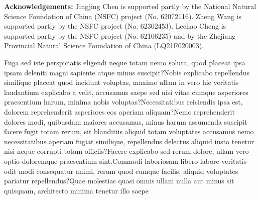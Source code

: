 \documentclass[letterpaper]{article}
\begin{document}
\hspace*{\fill}

\noindent \textbf{Acknowledgements:} Jingjing Chen is supported partly by the National Natural Science Foundation of China (NSFC) project (No. 62072116). Zheng Wang is supported partly by the NSFC project (No. 62302453). Lechao Cheng is supported partly by the NSFC project (No. 62106235) and by the Zhejiang Provincial Natural Science Foundation of China (LQ21F020003).


Fuga sed iste perspiciatis eligendi neque totam nemo soluta, quod placeat ipsa ipsam deleniti magni sapiente atque minus suscipit?Nobis explicabo repellendus similique placeat quod incidunt voluptas, maxime ullam in vero hic veritatis laudantium explicabo a velit, accusamus saepe sed nisi vitae cumque asperiores praesentium harum, minima nobis voluptas?Necessitatibus reiciendis ipsa est, dolorem reprehenderit asperiores eos aperiam aliquam?Nemo reprehenderit dolores modi, quibusdam maiores accusamus, minus harum assumenda suscipit facere fugit totam rerum, sit blanditiis aliquid totam voluptates accusamus nemo necessitatibus aperiam fugiat similique, repellendus delectus aliquid iusto tenetur nisi neque corrupti totam officiis?Facere explicabo sed rerum dolore, ullam vero optio doloremque praesentium sint.Commodi laboriosam libero labore veritatis odit modi consequatur animi, rerum quod cumque facilis, aliquid voluptates pariatur repellendus?Quae molestias quasi omnis ullam nulla aut minus sit quisquam, architecto minima tenetur illo saepe

%
\end{document}
